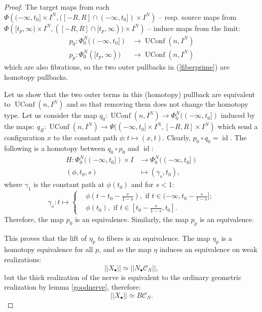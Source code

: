 \documentclass[12pt]{amsart}
\theoremstyle{plain}
\theoremstyle{definition}
\theoremstyle{remark}
\DeclareMathOperator{\UConf}{UConf}
\DeclareMathOperator{\id}{id}
\newcommand{\C}{\mathcal{C}}
\begin{document}
\begin{proof}
The target maps from each $\Phi\left((-\infty,t_0]\times I^N, ([-R,R]\cap(-\infty,t_0])\times I^N\right)$ -- resp. source maps from $\Phi\left([t_p,\infty)\times I^N, ([-R,R]\cap[t_p,\infty))\times I^N\right)$ -- induce maps from the limit:
\begin{align*}
p_0: \Phi_0^N((-\infty,t_0])&\rightarrow \UConf(n,I^N)\\
p_p: \Phi_0^N([t_p,\infty))&\rightarrow \UConf(n,I^N)
\end{align*}
which are also fibrations, so the two outer pullbacks in (\ref{fiberprime}) are homotopy pullbacks.

Let us show that the two outer terms in this (homotopy) pullback are equivalent to $\UConf(n,I^N)$
and so that removing them does not change the homotopy type.
Let us consider the map $q_0:\UConf(n,I^N)\rightarrow \Phi_0^N((-\infty,t_0])$ induced by the maps:
$q_R:\UConf(n,I^N)\rightarrow \Psi((-\infty,t_0]\times I^N, [-R,R]\times I^N)$ which send a configuration $x$ to the constant path $\phi:t\mapsto (x,t)$.
Clearly, $p_0\circ q_0 = \id$. The following is a homotopy between $q_0\circ p_0$ and $\id$:
\begin{align*}
H: \Phi_0^N((-\infty,t_0])\times I &\rightarrow \Phi_0^N((-\infty,t_0])\\
(\phi,t_0,s) &\mapsto (\gamma_s,t_0),
\end{align*}
where $\gamma_1$ is the constant path at $\phi(t_0)$ and for $s<1$:
$$\gamma_s:t \mapsto \begin{cases}
&\phi(t-t_0-\frac{s}{1-s}),\text{ if }t\in(-\infty,t_0-\frac{s}{1-s}];\\ 
&\phi(t_0),\text{ if }t\in[t_0-\frac{s}{1-s},t_0].
\end{cases}$$ 
Therefore, the map $p_0$ is an equivalence.
Similarly, the map $p_p$ is an equivalence.

This proves that the lift of $\eta_p$ to fibers is an equivalence.
The map $\eta_p$ is a homotopy equivalence for all $p$, and so the map $\eta$ induces an equivalence on weak realizations:
\[\vert\vert X_\bullet\vert\vert \simeq \vert\vert N_\bullet\C_N\vert\vert,\]
but the thick realization of the nerve is equivalent to the ordinary geometric realization by lemma \ref{goodnerve}, therefore:
\[\vert\vert X_\bullet\vert\vert \simeq B\C_N.\]


\end{proof}
\end{document}
